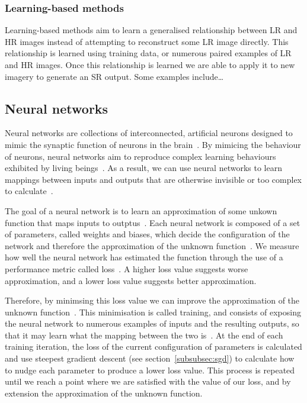 \subsubsection{Learning-based methods}
Learning-based methods aim to learn a generalised relationship between LR and HR images instead of attempting to reconstruct some LR image directly. This relationship is learned using training data, or numerous paired examples of LR and HR images. Once this relationship is learned we are able to apply it to new imagery to generate an SR output. Some examples include\dots

\subsection{Neural networks}\label{subsec:neural_networks}
Neural networks are collections of interconnected, artificial neurons designed to mimic the synaptic function of neurons in the brain~\cite{ref}. By mimicing the behaviour of neurons, neural networks aim to reproduce complex learning behaviours exhibited by living beings~\cite{ref}. As a result, we can use neural networks to learn mappings between inputs and outputs that are otherwise invisible or too complex to calculate~\cite{ref}.

The goal of a neural network is to learn an approximation of some unkown function that maps inputs to outptus~\cite{ref}. Each neural network is composed of a set of parameters, called weights and biases, which decide the configuration of the network and therefore the approximation of the unknown function~\cite{ref}. We measure how well the neural network has estimated the function through the use of a performance metric called loss~\cite{ref}. A higher loss value suggests worse approximation, and a lower loss value suggests better approximation.

Therefore, by minimsing this loss value we can improve the approximation of the unknown function~\cite{ref}. This minimisation is called training, and consists of exposing the neural network to numerous examples of inputs and the resulting outputs, so that it may learn what the mapping between the two is~\cite{ref}. At the end of each training iteration, the loss of the current configuration of parameters is calculated and use steepest gradient descent (see section~\ref{subsubsec:sgd}) to calculate how to nudge each parameter to produce a lower loss value. This process is repeated until we reach a point where we are satisfied with the value of our loss, and by extension the approximation of the unknown function.

